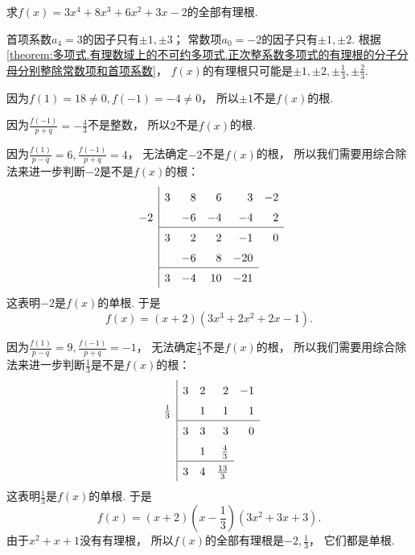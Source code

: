 \begin{example}
求\(f(x)=3x^4+8x^3+6x^2+3x-2\)的全部有理根.
\begin{solution}
首项系数\(a_4=3\)的因子只有\(\pm1,\pm3\)；
常数项\(a_0=-2\)的因子只有\(\pm1,\pm2\).
根据\cref{theorem:多项式.有理数域上的不可约多项式.正次整系数多项式的有理根的分子分母分别整除常数项和首项系数}，
\(f(x)\)的有理根只可能是\(\pm1,\pm2,\pm\frac13,\pm\frac23\).

因为\(f(1)=18\neq0,
f(-1)=-4\neq0\)，
所以\(\pm1\)不是\(f(x)\)的根.

因为\(\frac{f(-1)}{p+q}=-\frac43\)不是整数，
所以\(2\)不是\(f(x)\)的根.

因为\(\frac{f(1)}{p-q}=6,
\frac{f(-1)}{p+q}=4\)，
无法确定\(-2\)不是\(f(x)\)的根，
所以我们需要用综合除法来进一步判断\(-2\)是不是\(f(x)\)的根：\begin{equation*}
	\begin{array}{r|*5r}
		& 3 & 8 & 6 & 3 & -2 \\
		-2 && -6 & -4 & -4 & 2 \\ \cline{2-6}
		& 3 & 2 & 2 & -1 & 0 \\
		&& -6 & 8 & -20 \\ \cline{2-5}
		& 3 & -4 & 10 & -21
	\end{array}
\end{equation*}
这表明\(-2\)是\(f(x)\)的单根.
于是\begin{equation*}
	f(x)=(x+2)(3x^3+2x^2+2x-1).
\end{equation*}

因为\(\frac{f(1)}{p-q}=9,
\frac{f(-1)}{p+q}=-1\)，
无法确定\(\frac13\)不是\(f(x)\)的根，
所以我们需要用综合除法来进一步判断\(\frac13\)是不是\(f(x)\)的根：\begin{equation*}
	\def\arraystretch{1.5}
	\begin{array}{r|*5r}
		& 3 & 2 & 2 & -1 \\
		\frac13 && 1 & 1 & 1 \\ \cline{2-5}
		& 3 & 3 & 3 & 0 \\
		&& 1 & \frac43 \\ \cline{2-4}
		& 3 & 4 & \frac{13}3
	\end{array}
\end{equation*}
这表明\(\frac13\)是\(f(x)\)的单根.
于是\begin{equation*}
	f(x)=(x+2)\left(x-\frac13\right)
	(3x^2+3x+3).
\end{equation*}
由于\(x^2+x+1\)没有有理根，
所以\(f(x)\)的全部有理根是\(-2,\frac13\)，
它们都是单根.
\end{solution}
\end{example}

